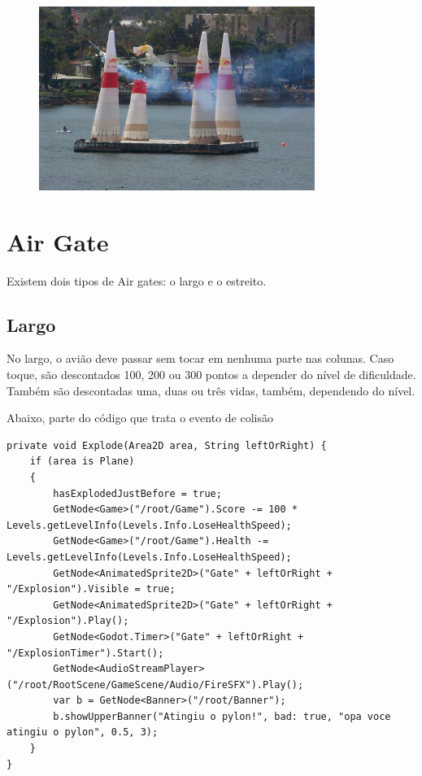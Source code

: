 \begin{figure}[h]
    \centering
    \includegraphics[width=0.8\textwidth]{red-bull-2.jpg}
\end{figure}

\section*{Air Gate}
Existem dois tipos de Air gates: o largo e o estreito.

\subsection*{Largo}
No largo, o avião deve passar sem tocar em nenhuma parte nas colunas. Caso toque, são descontados 100, 200 ou 300 pontos a depender do nível de dificuldade. 
Também são descontadas uma, duas ou três vidas, também, dependendo do nível.

Abaixo, parte do código que trata o evento de colisão
\begin{lstlisting}
private void Explode(Area2D area, String leftOrRight) {
    if (area is Plane)
    {
        hasExplodedJustBefore = true;
        GetNode<Game>("/root/Game").Score -= 100 * Levels.getLevelInfo(Levels.Info.LoseHealthSpeed);
        GetNode<Game>("/root/Game").Health -= Levels.getLevelInfo(Levels.Info.LoseHealthSpeed);
        GetNode<AnimatedSprite2D>("Gate" + leftOrRight + "/Explosion").Visible = true;
        GetNode<AnimatedSprite2D>("Gate" + leftOrRight + "/Explosion").Play();
        GetNode<Godot.Timer>("Gate" + leftOrRight + "/ExplosionTimer").Start();
        GetNode<AudioStreamPlayer>("/root/RootScene/GameScene/Audio/FireSFX").Play();
        var b = GetNode<Banner>("/root/Banner");
        b.showUpperBanner("Atingiu o pylon!", bad: true, "opa voce atingiu o pylon", 0.5, 3);
    }
}
\end{lstlisting}

